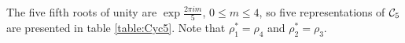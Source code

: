 \begin{example}[$\Cyc_5$]
	The five fifth roots of unity are $\exp{\frac{2\pi im}{5}}$, $0 \leq m \leq 4$, so five representations of $\Cyc_5$ are presented in table \ref{table:Cyc5}. Note that $\rho_1^* = \rho_4$ and $\rho_2^* = \rho_3$.
	
%			
\end{example}



